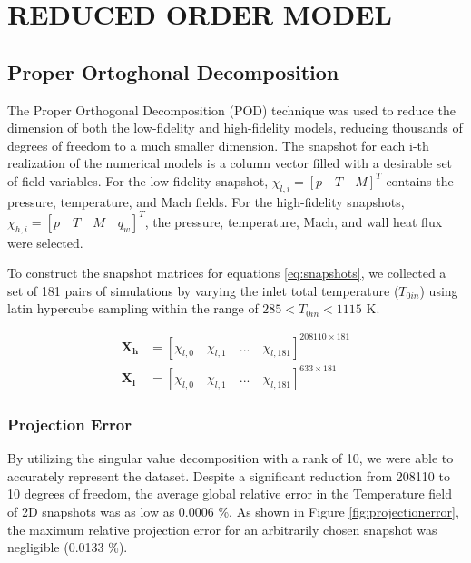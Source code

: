 \documentclass[10pt,fleqn,a4paper,twoside]{article}
\begin{document}
\section{REDUCED ORDER MODEL}

\subsection{Proper Ortoghonal Decomposition}

The Proper Orthogonal Decomposition (POD)\cite{Brunton2019} technique was used to reduce the dimension of both the low-fidelity and high-fidelity models, reducing thousands of degrees of freedom to a much smaller dimension. The snapshot for each i-th realization of the numerical models is a column vector filled with a desirable set of field variables. For the low-fidelity snapshot, $\chi_{l,i} = \left[ p \quad T \quad M\right]^T$ contains the pressure, temperature, and Mach fields. For the high-fidelity snapshots, $\chi_{h,i} = \left[ p \quad T \quad M \quad q_w\right]^T$, the pressure, temperature, Mach, and wall heat flux were selected.

To construct the snapshot matrices for equations \eqref{eq:snapshots}, we collected a set of 181 pairs of simulations by varying the inlet total temperature ($T_{0in}$) using latin hypercube sampling within the range of $285 < T_{0in} < 1115$ K.

\begin{align}
\mathbf{X_h} &= \left[ \chi_{l,0} \quad \chi_{l,1} \quad ... \quad \chi_{l,181}\right]^{208110 \times 181} \nonumber \\
\mathbf{X_l} &= \left[ \chi_{l,0} \quad \chi_{l,1} \quad ... \quad \chi_{l,181}\right]^{633 \times 181}
\label{eq:snapshots}
\end{align}

\subsubsection{Projection Error}

By utilizing the singular value decomposition with a rank of 10, we were able to accurately represent the dataset. Despite a significant reduction from 208110 to 10 degrees of freedom, the average global relative error in the Temperature field of 2D snapshots was as low as $0.0006$ \%. As shown in Figure \ref{fig:projectionerror}, the maximum relative projection error for an arbitrarily chosen snapshot was negligible (0.0133 \%).
\end{document}
